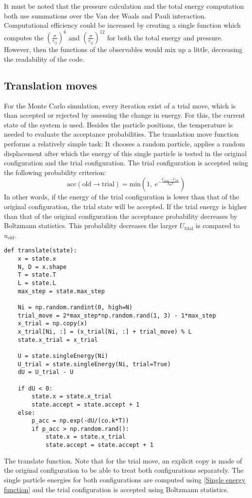 It must be noted that the pressure calculation and the total energy computation both use summations over the Van der Waals and Pauli interaction. Computational efficiency could be increased by creating a single function which computes the $\left(\frac{\sigma}{r_{ij}}\right)^6$ and $\left(\frac{\sigma}{r_{ij}}\right)^{12}$ for both the total energy and pressure. However, then the functions of the observables would mix up a little, decreasing the readability of the code.

\subsection{Translation moves}
For the Monte Carlo simulation, every iteration exist of a trial move, which is than accepted or rejected by assessing the change in energy. For this, the current state of the system is used. Besides the particle positions, the temperature is needed to evaluate the acceptance probabilities. The translation move function performs a relatively simple task: It chooses a random particle, applies a random displacement after which the energy of this single particle is tested in the original configuration and the trial configuration. The trial configuration is accepted using the following probability criterion:
\begin{equation}
	\text{acc}(\text{old} \rightarrow \text{trial})=\text{min}\left(1,\: e^{-\frac{U_\text{trial}-U_\text{old}}{k_\text{B}T}} \right)
\end{equation}
In other words, if the energy of the trial configuration is lower than that of the original configuration, the trial state will be accepted. If the trial energy is higher than that of the original configuration the acceptance probability decreases by Boltzmann statistics. This probability decreases the larger $U_\text{trial}$ is compared to $u_\text{old}$.

\begin{listing}[ht!]
	\begin{verbatim}
def translate(state):
	x = state.x
	N, D = x.shape
	T = state.T
	L = state.L
	max_step = state.max_step

	Ni = np.random.randint(0, high=N)
	trial_move = 2*max_step*np.random.rand(1, 3) - 1*max_step
	x_trial = np.copy(x)
	x_trial[Ni, :] = (x_trial[Ni, :] + trial_move) % L
	state.x_trial = x_trial

	U = state.singleEnergy(Ni)
	U_trial = state.singleEnergy(Ni, trial=True)
	dU = U_trial - U

	if dU < 0:
		state.x = state.x_trial
		state.accept = state.accept + 1
	else:
		p_acc = np.exp(-dU/(co.k*T))
		if p_acc > np.random.rand():
			state.x = state.x_trial
			state.accept = state.accept + 1
	\end{verbatim}
\caption{The translate function. Note that for the trial move, an explicit copy is made of the original configuration to be able to treat both configurations separately. The single particle energies for both configurations are computed using \cref{Single energy function} and the trial configuration is accepted using Boltzmann statistics.}
	\label{translate function}
\end{listing}

